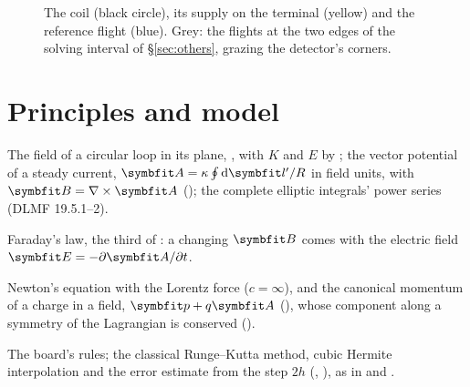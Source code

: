 \documentclass{leveldoc}
\begin{document}
\begin{figure}[htbp]
\centering
{}
\caption{The coil (black circle), its supply on the terminal (yellow) and the reference flight
(blue). Grey: the flights at the two edges of the solving interval of \S\ref{sec:others}, grazing
the detector's corners.}
\label{fig:board}
\end{figure}

\section{Principles and model}\label{sec:model}

\begin{principles}
  \item The field of a circular loop in its plane, , with $K$
    and $E$ by ; the vector potential of a steady current,
    $\vect{A} = \kappa\oint \dd\vect{l}'/R$ in field units, with $\vect{B} = \nabla\times\vect{A}$
    (); the complete elliptic integrals' power series (DLMF 19.5.1--2).
  \item Faraday's law, the third of : a changing $\vect{B}$
    comes with the electric field $\vect{E} = -\partial\vect{A}/\partial t$.
  \item Newton's equation with the Lorentz force  ($c = \infty$), and
    the canonical momentum of a charge in a field, $\vect{p} + q\vect{A}$ (),
    whose component along a symmetry of the Lagrangian is conserved ().
  \item The board's rules; the classical Runge--Kutta method, cubic Hermite interpolation and
    the error estimate from the step $2h$ (,
    ), as in  and
    .
\end{principles}
\end{document}
